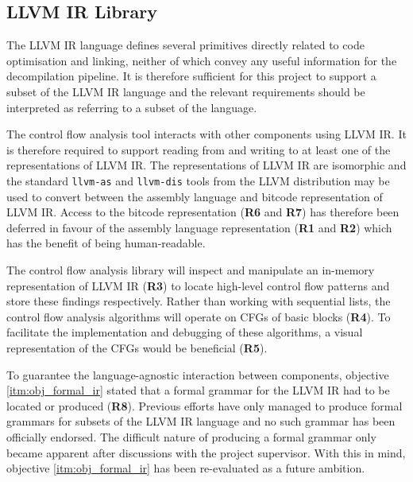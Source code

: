 
\subsection{LLVM IR Library}
\label{sec:req_llvm_ir_library}

The LLVM IR language defines several primitives directly related to code optimisation and linking, neither of which convey any useful information for the decompilation pipeline. It is therefore sufficient for this project to support a subset of the LLVM IR language and the relevant requirements should be interpreted as referring to a subset of the language.

The control flow analysis tool interacts with other components using LLVM IR. It is therefore required to support reading from and writing to at least one of the representations of LLVM IR. The representations of LLVM IR are isomorphic and the standard \texttt{llvm-as} and \texttt{llvm-dis} tools from the LLVM distribution may be used to convert between the assembly language and bitcode representation of LLVM IR. Access to the bitcode representation (\textbf{R6} and \textbf{R7}) has therefore been deferred in favour of the assembly language representation (\textbf{R1} and \textbf{R2}) which has the benefit of being human-readable.

The control flow analysis library will inspect and manipulate an in-memory representation of LLVM IR (\textbf{R3}) to locate high-level control flow patterns and store these findings respectively. Rather than working with sequential lists, the control flow analysis algorithms will operate on CFGs of basic blocks (\textbf{R4}). To facilitate the implementation and debugging of these algorithms, a visual representation of the CFGs would be beneficial (\textbf{R5}).

To guarantee the language-agnostic interaction between components, objective \ref{itm:obj_formal_ir} stated that a formal grammar for the LLVM IR had to be located or produced (\textbf{R8}). Previous efforts have only managed to produce formal grammars for subsets of the LLVM IR language \cite{formal_llvm_ir_spec,formalizing_llvm_ir} and no such grammar has been officially endorsed. The difficult nature of producing a formal grammar only became apparent after discussions with the project supervisor. With this in mind, objective \ref{itm:obj_formal_ir} has been re-evaluated as a future ambition.


